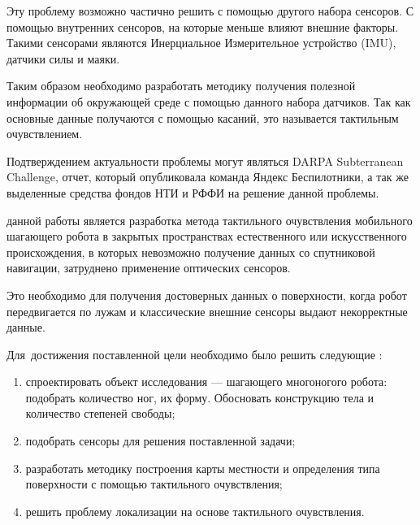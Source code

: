 \vspace{-0.5cm}
Эту проблему возможно частично решить с помощью другого набора сенсоров. С помощью внутренних сенсоров, на которые меньше влияют внешние факторы. Такими сенсорами являются Инерциальное Измерительное устройство (IMU), датчики силы и маяки.

Таким образом необходимо разработать методику получения полезной информации об окружающей среде с помощью данного набора датчиков. Так как основные данные получаются с помощью касаний, это называется тактильным очувствлением.

Подтверждением актуальности проблемы могут являться DARPA Subterranean Challenge, отчет, который опубликовала команда Яндекс Беспилотники, а так же выделенные средства фондов НТИ и РФФИ на решение данной проблемы.


{\aim} данной работы является разработка метода тактильного очувствления мобильного шагающего робота в закрытых пространствах естественного или искусственного происхождения, в которых невозможно получение данных со спутниковой навигации, затруднено применение оптических сенсоров.

Это необходимо для получения достоверных данных о поверхности, когда робот передвигается по лужам и классические внешние сенсоры выдают некорректные данные.

Для~достижения поставленной цели необходимо было решить следующие {\tasks}:
\begin{enumerate}[beginpenalty=10000] %
  \item спроектировать объект исследования --- шагающего многоногого робота: подобрать количество ног, их форму. Обосновать конструкцию тела и количество степеней свободы;
  \item подобрать сенсоры для решения поставленной задачи;
  \item разработать методику построения карты местности и определения типа поверхности с помощью тактильного очувствления;
  \item решить проблему локализации на основе тактильного очувствления.
\end{enumerate}

